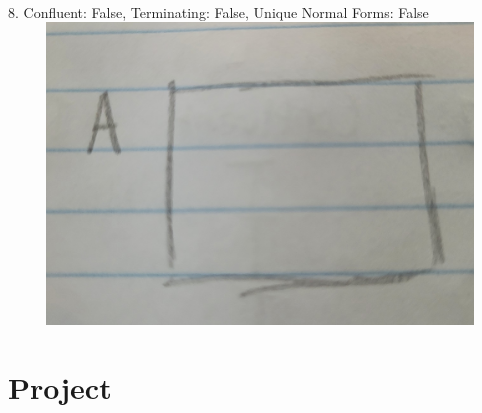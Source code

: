 \documentclass{article}
\theoremstyle{theorem}
\theoremstyle{definition}
\theoremstyle{remark}
\begin{document}
\\ 8. Confluent: False, Terminating: False, Unique Normal Forms: False
\\ \includegraphics[width=15cm, height=8cm]{Report Images/week7_13.jpg}
\section{Project}\label{Project}
\end{document}
